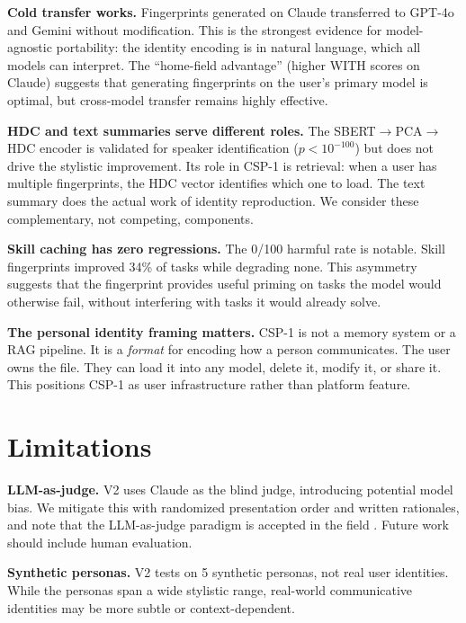 \documentclass[11pt,a4paper]{article}
\begin{document}
\textbf{Cold transfer works.} Fingerprints generated on Claude transferred to GPT-4o and Gemini without modification. This is the strongest evidence for model-agnostic portability: the identity encoding is in natural language, which all models can interpret. The ``home-field advantage'' (higher WITH scores on Claude) suggests that generating fingerprints on the user's primary model is optimal, but cross-model transfer remains highly effective.

\textbf{HDC and text summaries serve different roles.} The SBERT$\to$PCA$\to$HDC encoder is validated for speaker identification ($p < 10^{-100}$) but does not drive the stylistic improvement. Its role in CSP-1 is retrieval: when a user has multiple fingerprints, the HDC vector identifies which one to load. The text summary does the actual work of identity reproduction. We consider these complementary, not competing, components.

\textbf{Skill caching has zero regressions.} The 0/100 harmful rate is notable. Skill fingerprints improved 34\% of tasks while degrading none. This asymmetry suggests that the fingerprint provides useful priming on tasks the model would otherwise fail, without interfering with tasks it would already solve.

\textbf{The personal identity framing matters.} CSP-1 is not a memory system or a RAG pipeline. It is a \textit{format} for encoding how a person communicates. The user owns the file. They can load it into any model, delete it, modify it, or share it. This positions CSP-1 as user infrastructure rather than platform feature.

\section{Limitations}

\textbf{LLM-as-judge.} V2 uses Claude as the blind judge, introducing potential model bias. We mitigate this with randomized presentation order and written rationales, and note that the LLM-as-judge paradigm is accepted in the field \cite{zheng2023judging}. Future work should include human evaluation.

\textbf{Synthetic personas.} V2 tests on 5 synthetic personas, not real user identities. While the personas span a wide stylistic range, real-world communicative identities may be more subtle or context-dependent.
\end{document}
